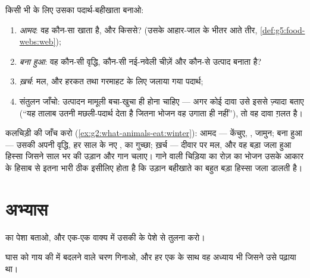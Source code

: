 \begin{method}[किसी जंतु के पदार्थ की जाँच]\label{met:g6:matter-from-food:audit}
किसी भी  के लिए उसका पदार्थ-बहीखाता बनाओ:
\begin{enumerate}
  \item \emph{आमद}: वह कौन-सा  खाता है, और किससे?
        (उसके आहार-जाल के भीतर आते तीर,
        \cref{def:g5:food-webs:web});
  \item \emph{बना हुआ}: वह कौन-सी वृद्धि, कौन-सी नई-नवेली चीज़ें और
        कौन-से उत्पाद बनाता है?
  \item \emph{ख़र्च}: मल, और हरकत तथा गरमाहट के लिए जलाया गया पदार्थ;
  \item संतुलन जाँचो: उत्पादन मामूली बचा-खुचा ही होना चाहिए --- अगर
        कोई दावा उसे इससे ज़्यादा बताए (``यह तालाब उतनी मछली-पदार्थ
        देता है जितना भोजन वह उगाता ही नहीं''), तो वह दावा ग़लत है।
\end{enumerate}
\end{method}

\begin{example}[जाँच काम में]\label{ex:g6:matter-from-food:audituse}
कलचिड़ी की जाँच करो (\cref{ex:g2:what-animals-eat:winter}): आमद ---
केंचुए, , जामुन; बना हुआ --- उसकी अपनी वृद्धि, हर साल के नए ,
 का गुच्छा; ख़र्च --- दीवार पर मल, और वह बड़ा जला हुआ हिस्सा जिसने
साल भर की उड़ान और गान चलाए। गाने वाली चिड़िया का रोज़ का भोजन उसके आकार
के हिसाब से इतना भारी ठीक इसीलिए होता है कि उड़ान बहीखाते का बहुत बड़ा
हिस्सा जला डालती है।
\end{example}

\section{अभ्यास}

\begin{exercise}[$\star$]\label{exo:g6:matter-from-food:1}
 का पेशा बताओ, और एक-एक वाक्य में उसकी  के पेशे से
तुलना करो।
\end{exercise}

\begin{exercise}[$\star$]\label{exo:g6:matter-from-food:2}
घास को गाय की  में बदलने वाले चरण गिनाओ, और हर एक के साथ वह अध्याय
भी जिसने उसे पढ़ाया था।
\end{exercise}

